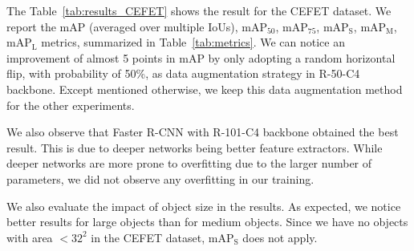 The Table~\ref{tab:results_CEFET} shows the result for the CEFET dataset.
We report the mAP (averaged over multiple IoUs), mAP$_{50}$, mAP$_{75}$, mAP$_{\textrm{S}}$, mAP$_{\textrm{M}}$, mAP$_{\textrm{L}}$ metrics, summarized in Table~\ref{tab:metrics}.
We can notice an improvement of almost 5 points in mAP by only adopting a random horizontal flip, with probability of 50\%, as data augmentation strategy in R-50-C4 backbone.
Except mentioned otherwise, we keep this data augmentation method for the other experiments.
\begin{table}[b!]
\centering
{}
\caption{Main results for CEFET dataset.}
\label{tab:results_CEFET}
\end{table}

We also observe that Faster R-CNN with R-101-C4 backbone obtained the best result.
This is due to deeper networks being better feature extractors.
While deeper networks are more prone to overfitting due to the larger number of parameters, we did not observe any overfitting in our training.

We also evaluate the impact of object size in the results.
As expected, we notice better results for large objects than for medium objects.
Since we have no objects with area $< 32^2$ in the CEFET dataset, mAP$_{\textrm{S}}$ does not apply.

